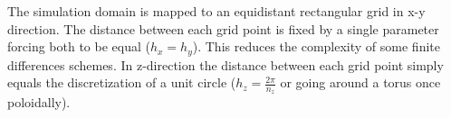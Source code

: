 \documentclass[master.tex]{subfiles}
\begin{document}
The simulation domain is mapped to an equidistant rectangular grid in x-y direction. The distance between each grid point is fixed by a single parameter forcing both to be equal ($h_x = h_y$). This reduces the complexity of some finite differences schemes. In z-direction the distance between each grid point simply equals the discretization of a unit circle ($h_z= \frac{2\pi}{n_z}$ or going around a torus once poloidally).
\end{document}

